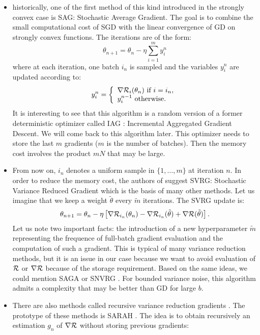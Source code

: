 \begin{itemize}
	\item historically, one of the first method of this kind introduced in the strongly convex case is SAG: Stochastic Average Gradient. The goal is to combine the small computational cost of SGD with the linear convergence of GD on strongly convex functions. The iterations are of the form:
	\begin{equation*}
		\theta_{n+1}=\theta_n-\eta \sum_{i=1}^m y_i^n
	\end{equation*}
	where at each iteration, one batch $i_n$ is sampled and the variables $y_i^n$ are updated according to:
	\begin{equation*}
		y_i^n =
		\left\{
		\begin{array}{ll}
			\nabla \mathcal{R}_i(\theta_n) \text{ if } i=i_n, \\
			y_i^{n-1} \text{ otherwise}.
		\end{array}
		\right.
	\end{equation*}
It is interesting to see that this algorithm is a random version of a former deterministic optimizer called IAG \cite{IAG_first}: Incremental Aggregated Gradient Descent. We will come back to this algorithm later. This optimizer needs to store the last $m$ gradients ($m$ is the number of batches). Then the memory cost involves the product $mN$ that may be large.
\item From now on, $i_n$ denotes a uniform sample in $\{1,\dots,m\}$ at iteration $n$. In order to reduce the memory cost, the authors of \cite{SVRG_first} suggest SVRG: Stochastic Variance Reduced Gradient which is the basis of many other methods. Let us imagine that we keep a weight $\tilde{\theta}$ every $\tilde{m}$ iterations. The SVRG update is:
\begin{equation*}
	\theta_{n+1} = \theta_n -\eta \left[\nabla \mathcal{R}_{i_n}(\theta_n)-\nabla \mathcal{R}_{i_n}(\tilde{\theta})+\nabla \mathcal{R}(\tilde{\theta})\right].
\end{equation*}
Let us note two important facts: the introduction of a new hyperparameter $\tilde{m}$ representing the frequence of full-batch gradient evaluation and the computation of such a
    gradient. This is typical of many variance reduction methods, but it is an issue in our case because we want to avoid evaluation of $\mathcal{R}$ or $\nabla \mathcal{R}$ because of the storage
    requirement. Based on the same ideas, we could mention SAGA \cite{SAGA_first} or SNVRG \cite{SNVRG_first}. For bounded variance noise, this algorithm admits a complexity that
    may be better than GD for large $b$. 
\item There are also methods called recursive variance reduction gradients . The prototype of these methods is SARAH \cite{SARAH_first}. The idea is to obtain recursively an estimation $g_n$ of $\nabla \mathcal{R}$ without storing previous gradients:

\end{itemize}
